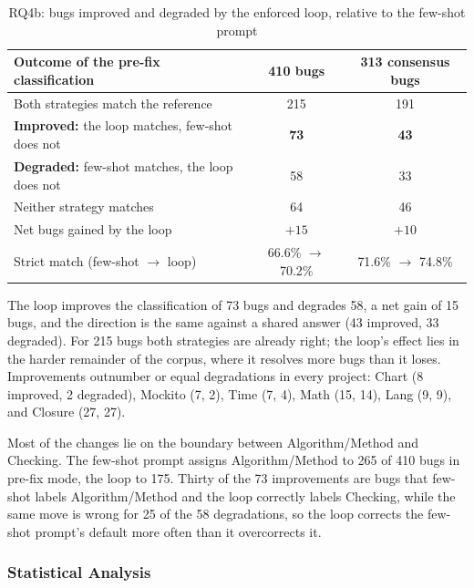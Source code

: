 \documentclass{iutbscthesis}
\begin{document}
\begin{table}[!htbp]
    \centering
    \begin{tabular}{p{7.4cm} c c}
        \toprule
        \textbf{Outcome of the pre-fix classification} & \textbf{410 bugs} & \textbf{313 consensus bugs} \\
        \midrule
        Both strategies match the reference & 215 & 191 \\
        \textbf{Improved:} the loop matches, few-shot does not & \textbf{73} & \textbf{43} \\
        \textbf{Degraded:} few-shot matches, the loop does not & 58 & 33 \\
        Neither strategy matches & 64 & 46 \\
        \midrule
        Net bugs gained by the loop & $+15$ & $+10$ \\
        Strict match (few-shot $\rightarrow$ loop) & 66.6\% $\rightarrow$ 70.2\% & 71.6\% $\rightarrow$ 74.8\% \\
        \bottomrule
    \end{tabular}
    \caption{RQ4b: bugs improved and degraded by the enforced loop, relative to the few-shot prompt}
    \label{tab:rq4b_bugs}
\end{table}

The loop improves the classification of 73 bugs and degrades 58, a net gain of 15 bugs, and the direction is the same against a shared answer (43 improved, 33 degraded). For 215 bugs both strategies are already right; the loop's effect lies in the harder remainder of the corpus, where it resolves more bugs than it loses. Improvements outnumber or equal degradations in every project: Chart (8 improved, 2 degraded), Mockito (7, 2), Time (7, 4), Math (15, 14), Lang (9, 9), and Closure (27, 27).

Most of the changes lie on the boundary between Algorithm/\allowbreak Method and Checking. The few-shot prompt assigns Algorithm/\allowbreak Method to 265 of 410 bugs in pre-fix mode, the loop to 175. Thirty of the 73 improvements are bugs that few-shot labels Algorithm/\allowbreak Method and the loop correctly labels Checking, while the same move is wrong for 25 of the 58 degradations, so the loop corrects the few-shot prompt's default more often than it overcorrects it.

\subsubsection{Statistical Analysis}
\end{document}
